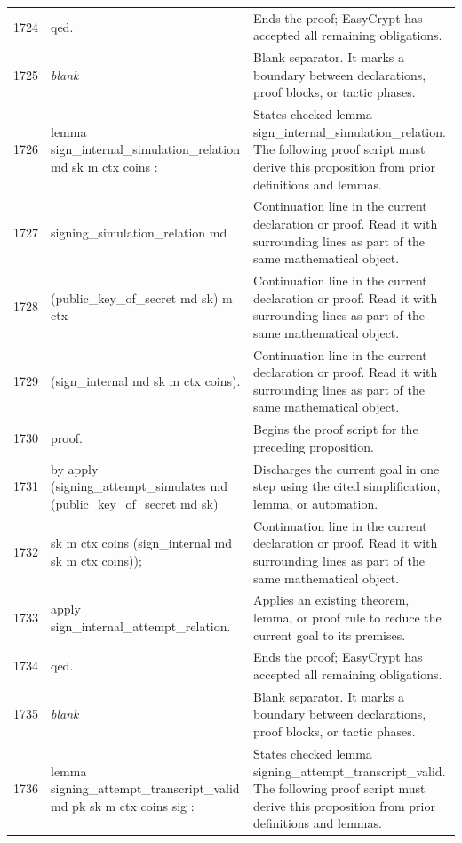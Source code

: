 \documentclass[10pt]{article}
\begin{document}
\begin{longtable}{r L{0.53\textwidth} L{0.37\textwidth}}
1724 & {\ttfamily\scriptsize qed.} & Ends the proof; EasyCrypt has accepted all remaining obligations. \\
1725 & {\ttfamily\scriptsize \emph{blank}} & Blank separator.  It marks a boundary between declarations, proof blocks, or tactic phases. \\
1726 & {\ttfamily\scriptsize lemma sign\_internal\_simulation\_relation md sk m ctx coins :} & States checked lemma sign\_internal\_simulation\_relation.  The following proof script must derive this proposition from prior definitions and lemmas. \\
1727 & {\ttfamily\scriptsize   signing\_simulation\_relation md} & Continuation line in the current declaration or proof.  Read it with surrounding lines as part of the same mathematical object. \\
1728 & {\ttfamily\scriptsize     (public\_key\_of\_secret md sk) m ctx} & Continuation line in the current declaration or proof.  Read it with surrounding lines as part of the same mathematical object. \\
1729 & {\ttfamily\scriptsize     (sign\_internal md sk m ctx coins).} & Continuation line in the current declaration or proof.  Read it with surrounding lines as part of the same mathematical object. \\
1730 & {\ttfamily\scriptsize proof.} & Begins the proof script for the preceding proposition. \\
1731 & {\ttfamily\scriptsize by apply (signing\_attempt\_simulates md (public\_key\_of\_secret md sk)} & Discharges the current goal in one step using the cited simplification, lemma, or automation. \\
1732 & {\ttfamily\scriptsize             sk m ctx coins (sign\_internal md sk m ctx coins));} & Continuation line in the current declaration or proof.  Read it with surrounding lines as part of the same mathematical object. \\
1733 & {\ttfamily\scriptsize    apply sign\_internal\_attempt\_relation.} & Applies an existing theorem, lemma, or proof rule to reduce the current goal to its premises. \\
1734 & {\ttfamily\scriptsize qed.} & Ends the proof; EasyCrypt has accepted all remaining obligations. \\
1735 & {\ttfamily\scriptsize \emph{blank}} & Blank separator.  It marks a boundary between declarations, proof blocks, or tactic phases. \\
1736 & {\ttfamily\scriptsize lemma signing\_attempt\_transcript\_valid md pk sk m ctx coins sig :} & States checked lemma signing\_attempt\_transcript\_valid.  The following proof script must derive this proposition from prior definitions and lemmas. \\

\end{longtable}
\end{document}
